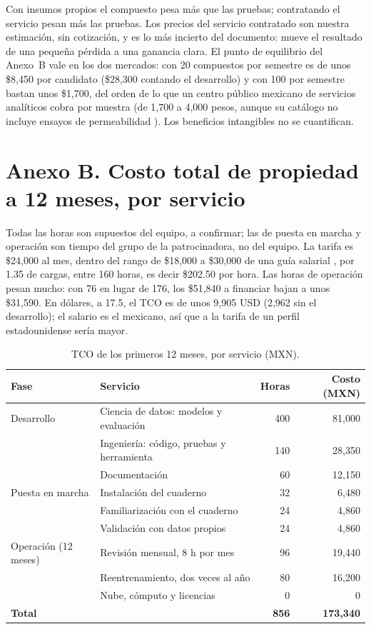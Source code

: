 \documentclass[letterpaper,11pt]{article}
\begin{document}
\noindent Con insumos propios el compuesto pesa más que las pruebas; contratando el servicio pesan más las pruebas. Los precios del servicio contratado son nuestra estimación, sin cotización, y es lo más incierto del documento: mueve el resultado de una pequeña pérdida a una ganancia clara. El punto de equilibrio del Anexo~B vale en los dos mercados: con 20 compuestos por semestre es de unos \$8,450 por candidato (\$28,300 contando el desarrollo) y con 100 por semestre bastan unos \$1,700, del orden de lo que un centro público mexicano de servicios analíticos cobra por muestra (de 1,700 a 4,000 pesos, aunque su catálogo no incluye ensayos de permeabilidad \parencite{ciatej2026catalogo}). Los beneficios intangibles no se cuantifican.

\section*{Anexo B. Costo total de propiedad a 12 meses, por servicio}
\noindent Todas las horas son supuestos del equipo, a confirmar; las de puesta en marcha y operación son tiempo del grupo de la patrocinadora, no del equipo. La tarifa es \$24,000 al mes, dentro del rango de \$18,000 a \$30,000 de una guía salarial \parencite{keepcoding2026salarios}, por 1.35 de cargas, entre 160 horas, es decir \$202.50 por hora. Las horas de operación pesan mucho: con 76 en lugar de 176, los \$51,840 a financiar bajan a unos \$31,590. En dólares, a 17.5, el TCO es de unos 9,905 USD (2,962 sin el desarrollo); el salario es el mexicano, así que a la tarifa de un perfil estadounidense sería mayor.

\begin{table}[h]
\centering
\caption{TCO de los primeros 12 meses, por servicio (MXN).}
\label{tab:tco}
\small
\begin{tabular}{llrr}
\toprule
Fase & Servicio & Horas & Costo (MXN)\\
\midrule
Desarrollo & Ciencia de datos: modelos y evaluación & 400 & 81,000\\
 & Ingeniería: código, pruebas y herramienta & 140 & 28,350\\
 & Documentación & 60 & 12,150\\
Puesta en marcha & Instalación del cuaderno & 32 & 6,480\\
 & Familiarización con el cuaderno & 24 & 4,860\\
 & Validación con datos propios & 24 & 4,860\\
Operación (12 meses) & Revisión mensual, 8 h por mes & 96 & 19,440\\
 & Reentrenamiento, dos veces al año & 80 & 16,200\\
 & Nube, cómputo y licencias & 0 & 0\\
\midrule
\textbf{Total} & & \textbf{856} & \textbf{173,340}\\
\bottomrule
\end{tabular}
\end{table}
\end{document}

